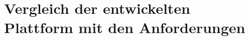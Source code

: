 \section{Vergleich der entwickelten Plattform mit den Anforderungen}\label{sec:bewertung-vergleich-anforderungen}